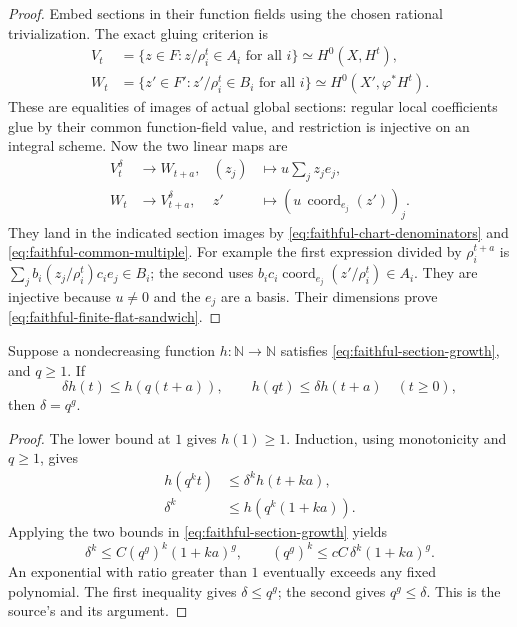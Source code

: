 \begin{proof}
Embed sections in their function fields using the chosen
rational trivialization.  The exact gluing criterion is
\[
 \begin{split}
 V_t&=\{z\in F:z/\rho_i^t\in A_i\text{ for all }i\}
                         \simeq H^0(X,H^t),\\
 W_t&=\{z'\in F':z'/\rho_i^t\in B_i\text{ for all }i\}
                         \simeq H^0(X',\varphi^*H^t).
 \end{split}
\]
These are equalities of images of actual global sections:
regular local coefficients glue by their common function-field
value, and restriction is injective on an integral scheme.
Now the two linear maps are
\[
 \begin{aligned}
 V_t^\delta&\longrightarrow W_{t+a},
                       &(z_j)&\longmapsto u\sum_j z_j e_j,\\
 W_t&\longrightarrow V_{t+a}^\delta,
                       &z'&\longmapsto
                              (u\,\operatorname{coord}_{e_j}(z'))_j .
 \end{aligned}
 \tag{DG5}\label{eq:faithful-sandwich-maps}
\]
They land in the indicated section images by
\eqref{eq:faithful-chart-denominators} and
\eqref{eq:faithful-common-multiple}.
For example the first expression divided by \(\rho_i^{t+a}\)
is \(\sum_j b_i(z_j/\rho_i^t)c_i e_j\in B_i\);
the second uses \(b_i c_i\operatorname{coord}_{e_j}
(z'/\rho_i^t)\in A_i\).
They are injective because \(u\ne0\) and the \(e_j\) are a
basis.  Their dimensions prove
\eqref{eq:faithful-finite-flat-sandwich}.
\end{proof}

\begin{srlemma}
\label{lem:faithful-degree-growth-comparison}
Suppose a nondecreasing function \(h:\mathbb N\to\mathbb N\)
satisfies \eqref{eq:faithful-section-growth}, and \(q\ge1\).
If
\[
         \delta h(t)\le h(q(t+a)),\qquad
                 h(qt)\le\delta h(t+a)\quad(t\ge0),
\]
then \(\delta=q^g\).
\end{srlemma}
\begin{proof}
The lower bound at \(1\) gives \(h(1)\ge1\).
Induction, using monotonicity and \(q\ge1\), gives
\[
 \begin{split}
 h(q^kt)&\le\delta^k h(t+ka),\\
 \delta^k&\le h(q^k(1+ka)).
 \end{split}
\]
Applying the two bounds in
\eqref{eq:faithful-section-growth} yields
\[
 \delta^k\le C(q^g)^k(1+ka)^g,\qquad
       (q^g)^k\le cC\,\delta^k(1+ka)^g .
\]
An exponential with ratio greater than \(1\) eventually
exceeds any fixed polynomial.
The first inequality gives \(\delta\le q^g\);
the second gives \(q^g\le\delta\).
This is the source's 
and its  argument.
\end{proof}

